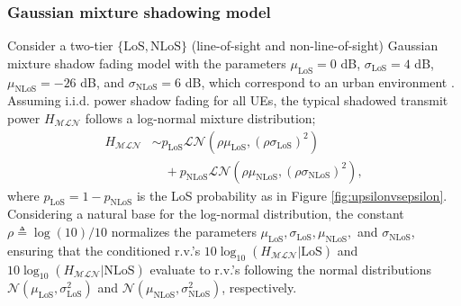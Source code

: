 \documentclass[lettersize,journal]{IEEEtran}
\begin{document}



\subsubsection{Gaussian mixture shadowing model}
\label{sec:guassianmixture}

Consider a two-tier $\{\text{LoS},\text{NLoS}\}$ (line-of-sight and non-line-of-sight) Gaussian mixture shadow fading model with the parameters $\mu_{\text{LoS}} = 0$ dB, $\sigma_{\text{LoS}} = 4$ dB, $\mu_{\text{NLoS}} = -26$ dB, and $\sigma_{\text{NLoS}} = 6$ dB, which correspond to an urban environment \cite{TR38.811}. Assuming i.i.d. power shadow fading for all UEs, the typical shadowed transmit power $H_{\mathcal{M}\mathcal{L}\mathcal{N}}$ follows a log-normal mixture distribution;
\begin{align}
  \label{eq:tier2lognormal}
  H_{\mathcal{M}\mathcal{L}\mathcal{N}} &\sim p_{\text{LoS}} \mathcal{L}\mathcal{N}(\rho \mu_{\text{LoS}}, (\rho \sigma_{\text{LoS}})^2) \nonumber \\
  &\quad + p_{\text{NLoS}} \mathcal{L}\mathcal{N}(\rho \mu_{\text{NLoS}}, (\rho \sigma_{\text{NLoS}})^2),
\end{align}
where $p_{\text{LoS}}=1-p_{\text{NLoS}}$ is the LoS probability as in Figure \ref{fig:upsilonvsepsilon}. Considering a natural base for the log-normal distribution, the constant $\rho \triangleq \log(10)/10$ normalizes the parameters $\mu_{\text{LoS}}, \sigma_{\text{LoS}}, \mu_{\text{NLoS}},$ and $\sigma_{\text{NLoS}}$, ensuring that the conditioned r.v.'s $10 \log_{10}(H_{\mathcal{MLN}}|\text{LoS})$ and $10 \log_{10}(H_{\mathcal{MLN}}|\text{NLoS})$ evaluate to r.v.'s following the normal distributions $\mathcal{N}(\mu_{\text{LoS}}, \sigma_{\text{LoS}}^2)$ and $\mathcal{N}(\mu_{\text{NLoS}}, \sigma_{\text{NLoS}}^2)$, respectively.
\end{document}
